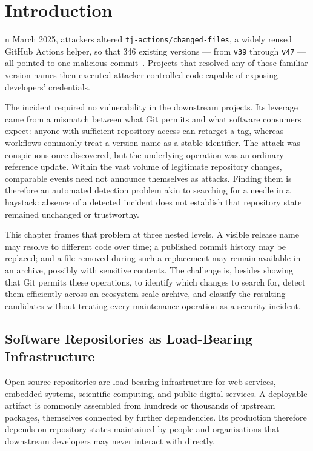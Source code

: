 %
%
\chapter{Introduction}
\label{chap:intro}

n March 2025, attackers altered \texttt{tj-actions/changed-files}, a widely reused GitHub Actions helper, so that \num{346} existing versions --- from \texttt{v39} through \texttt{v47} --- all pointed to one malicious commit~\cite{paloalto_unit42_2025}.
Projects that resolved any of those familiar version names then executed attacker-controlled code capable of exposing developers' credentials.

The incident required no vulnerability in the downstream projects.
Its leverage came from a mismatch between what Git permits and what software consumers expect: anyone with sufficient repository access can retarget a tag, whereas workflows commonly treat a version name as a stable identifier.
The attack was conspicuous once discovered, but the underlying operation was an ordinary reference update.
Within the vast volume of legitimate repository changes, comparable events need not announce themselves as attacks.
Finding them is therefore an automated detection problem akin to searching for a needle in a haystack: absence of a detected incident does not establish that repository state remained unchanged or trustworthy.

This chapter frames that problem at three nested levels.
A visible release name may resolve to different code over time; a published commit history may be replaced; and a file removed during such a replacement may remain available in an archive, possibly with sensitive contents.
The challenge is, besides showing that Git permits these operations, to identify which changes to search for, detect them efficiently across an ecosystem-scale archive, and classify the resulting candidates without treating every maintenance operation as a security incident.

\section{Software Repositories as Load-Bearing Infrastructure}
\label{sec:intro-context}

Open-source repositories are load-bearing infrastructure for web services, embedded systems, scientific computing, and public digital services.
A deployable artifact is commonly assembled from hundreds or thousands of upstream packages, themselves connected by further dependencies.
Its production therefore depends on repository states maintained by people and organisations that downstream developers may never interact with directly.

